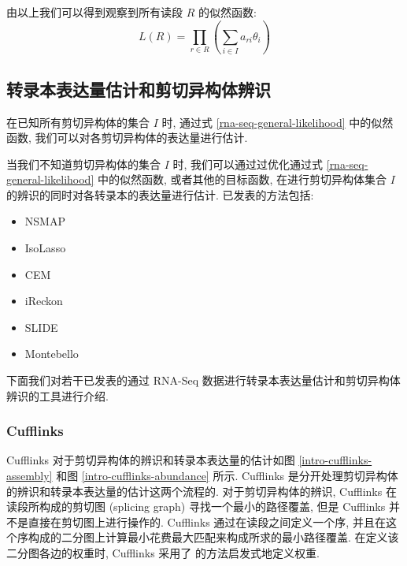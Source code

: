 由以上我们可以得到观察到所有读段 $R$ 的似然函数: 
\begin{equation}
\label{rna-seq-general-likelihood}
L(R) = \prod_{r \in R} (\sum_{i \in I} a_{ri} \theta_i)
\end{equation}

\subsection{转录本表达量估计和剪切异构体辨识}
在已知所有剪切异构体的集合 $I$ 时, 通过式 \eqref{rna-seq-general-likelihood} 中的似然函数, 
我们可以对各剪切异构体的表达量进行估计. 

当我们不知道剪切异构体的集合 $I$ 时, 
我们可以通过过优化通过式 \eqref{rna-seq-general-likelihood} 中的似然函数, 
或者其他的目标函数, 在进行剪切异构体集合 $I$ 的辨识的同时对各转录本的表达量进行估计. 
已发表的方法包括: 
\begin{itemize}
\item NSMAP \cite{nsmap.21575225}

\item IsoLasso \cite{isolasso.recomb}

\item CEM \cite{Li15112012}

\item iReckon \cite{Mezlini29112012}

\item SLIDE \cite{Li13122011}

\item Montebello \cite{Hiller.Montebello}
\end{itemize}

下面我们对若干已发表的通过 RNA-Seq 数据进行转录本表达量估计和剪切异构体辨识的工具进行介绍. 

\subsubsection{Cufflinks}
Cufflinks 对于剪切异构体的辨识和转录本表达量的估计如图 \ref{intro-cufflinks-assembly} 
和图 \ref{intro-cufflinks-abundance} 所示. 
Cufflinks 是分开处理剪切异构体的辨识和转录本表达量的估计这两个流程的. 
对于剪切异构体的辨识, Cufflinks 在 读段所构成的剪切图 
(splicing graph) \cite{Heber01072002} 寻找一个最小的路径覆盖, 
但是 Cufflinks 并不是直接在剪切图上进行操作的. 
Cufflinks 通过在读段之间定义一个序, 
并且在这个序构成的二分图上计算最小花费最大匹配来构成所求的最小路径覆盖. 
在定义该二分图各边的权重时, Cufflinks 采用了  
的方法启发式地定义权重. 

